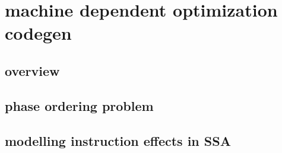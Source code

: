 \chapter{machine dependent optimization codegen}



\section{overview}
\section{phase ordering problem}
\section{modelling instruction effects in SSA}
